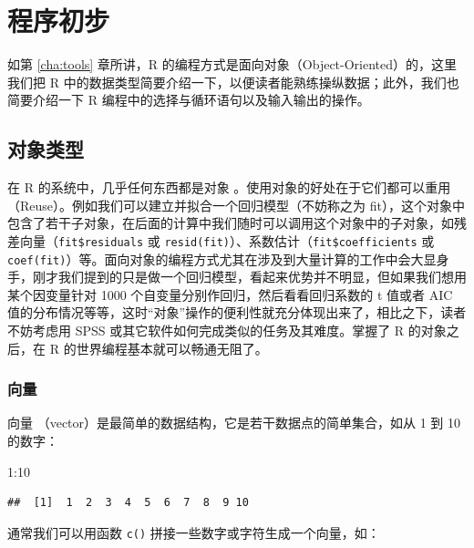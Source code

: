 \documentclass[
  b5paper,
  UTF8,twoside]{book}
\newenvironment{Shaded}{\begin{snugshade}}{\end{snugshade}}
\newcommand{\DecValTok}[1]{\textcolor[rgb]{0.00,0.00,0.81}{#1}}
\newcommand{\SpecialCharTok}[1]{\textcolor[rgb]{0.00,0.00,0.00}{#1}}
\begin{document}
\hypertarget{appendix-ux9644ux5f55}{%
\appendix}


\hypertarget{chap:programming}{%
\chapter{程序初步}\label{chap:programming}}

如第 \ref{cha:tools} 章所讲，R 的编程方式是面向对象（Object-Oriented）的，这里我们把 R 中的数据类型简要介绍一下，以便读者能熟练操纵数据；此外，我们也简要介绍一下 R 编程中的选择与循环语句以及输入输出的操作。

\hypertarget{sec:object}{%
\section{对象类型}\label{sec:object}}

在 R 的系统中，几乎任何东西都是对象 。使用对象的好处在于它们都可以重用（Reuse）。例如我们可以建立并拟合一个回归模型（不妨称之为 fit），这个对象中包含了若干子对象，在后面的计算中我们随时可以调用这个对象中的子对象，如残差向量（\texttt{fit\$residuals} 或 \texttt{resid(fit)}）、系数估计（\texttt{fit\$coefficients} 或 \texttt{coef(fit)}）等。面向对象的编程方式尤其在涉及到大量计算的工作中会大显身手，刚才我们提到的只是做一个回归模型，看起来优势并不明显，但如果我们想用某个因变量针对 1000 个自变量分别作回归，然后看看回归系数的 t 值或者 AIC 值的分布情况等等，这时``对象''操作的便利性就充分体现出来了，相比之下，读者不妨考虑用 SPSS 或其它软件如何完成类似的任务及其难度。掌握了 R 的对象之后，在 R 的世界编程基本就可以畅通无阻了。

\hypertarget{ux5411ux91cf}{%
\subsection{向量}\label{ux5411ux91cf}}

向量 （vector）是最简单的数据结构，它是若干数据点的简单集合，如从 1 到 10 的数字：

\begin{Shaded}
\begin{Highlighting}[]
\DecValTok{1}\SpecialCharTok{:}\DecValTok{10}
\end{Highlighting}
\end{Shaded}

\begin{verbatim}
##  [1]  1  2  3  4  5  6  7  8  9 10
\end{verbatim}

通常我们可以用函数 \texttt{c()} 拼接一些数字或字符生成一个向量，如：
\end{document}
